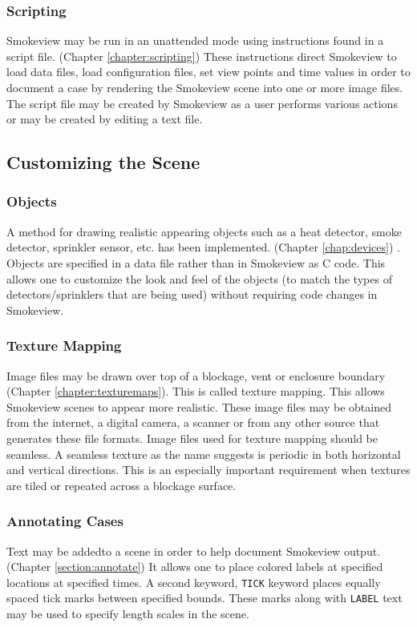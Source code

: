 \documentclass[11pt,twoside]{book}
\begin{document}
\subsubsection{Scripting} Smokeview may be run in an unattended mode using
instructions found in a script file. (Chapter
\ref{chapter:scripting}) These instructions direct Smokeview to
load data files, load configuration files, set view points and
time values in order to document a case by rendering the Smokeview
scene into one or more image files. The script file may be created
by Smokeview as a user performs various actions or may be created
by editing a text file.

\subsection{Customizing the Scene}

\subsubsection{Objects}A method for drawing realistic appearing objects such as a heat detector,
smoke detector, sprinkler sensor, etc. has been implemented.
(Chapter \ref{chap:devices}) . Objects are specified in a data
file rather than in Smokeview as C code. This allows one to
customize the look and feel of the objects (to match the types of
detectors/sprinklers that are being used) without requiring code
changes in Smokeview.

\subsubsection{Texture Mapping} Image files may be drawn over top
of a blockage, vent or enclosure boundary (Chapter
\ref{chapter:texturemaps}). This is called texture mapping.  This
allows Smokeview scenes to appear more realistic. These image
files may be obtained from the internet, a digital camera, a
scanner or from any other source that generates these file
formats. Image files used for texture mapping should be seamless.
A seamless texture as the name suggests is periodic in both
horizontal and vertical directions. This is an especially
important requirement when textures are tiled or repeated across a
blockage surface.

\subsubsection{Annotating Cases}Text may be addedto a scene in order to help document Smokeview
output. (Chapter \ref{section:annotate}) It allows one to place
colored labels at specified locations at specified times. A second
keyword, {\tt TICK} keyword places equally spaced tick marks
between specified bounds. These marks along with {\tt LABEL} text
may be used to specify length scales in the scene.
\end{document}
